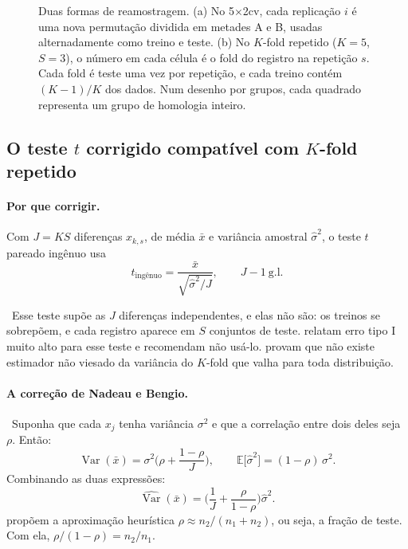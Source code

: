\documentclass[11pt,a4paper]{article}
\newcommand{\etiqueta}[2]{\tcbox[on line, colback=#1!10, colframe=#1!75!black,
  boxrule=0.4pt, arc=1.2pt, left=1.5pt, right=1.5pt, top=0pt, bottom=0pt,
  fontupper=\sffamily\scriptsize\bfseries]{#2}}
\newcommand{\lit}{\etiqueta{oiBlue}{Literatura}}
\DeclareMathOperator{\Var}{Var}
\begin{document}
\begin{figure}[t]
\centering

\caption{Duas formas de reamostragem. (a) No 5$\times$2cv, cada replicação $i$ é uma nova permutação dividida em metades A e B, usadas alternadamente como treino e teste. (b) No $K$-fold repetido ($K=5$, $S=3$), o número em cada célula é o fold do registro na repetição $s$. Cada fold é teste uma vez por repetição, e cada treino contém $(K-1)/K$ dos dados. Num desenho por grupos, cada quadrado representa um grupo de homologia inteiro.}
\label{fig:reamostragem}
\end{figure}

\subsection{O teste \texorpdfstring{$t$}{t} corrigido compatível com \texorpdfstring{$K$}{K}-fold repetido}
\label{sec:tcorrigido}

\paragraph{Por que corrigir.} Com $J=KS$ diferenças $x_{k,s}$, de média $\bar{x}$ e variância amostral $\hat{\sigma}^2$, o teste $t$ pareado ingênuo usa
\begin{equation}
t_{\text{ingênuo}}=\frac{\bar{x}}{\sqrt{\hat{\sigma}^2/J}},\qquad J-1\ \text{g.l.}
\end{equation}

\lit\ Esse teste supõe as $J$ diferenças independentes, e elas não são: os treinos se sobrepõem, e cada registro aparece em $S$ conjuntos de teste. \citet{bouckaert2004} relatam erro tipo I muito alto para esse teste e recomendam não usá-lo. \citet{bengio2004} provam que não existe estimador não viesado da variância do $K$-fold que valha para toda distribuição.

\paragraph{A correção de Nadeau e Bengio.}
\lit\ Suponha que cada $x_j$ tenha variância $\sigma^2$ e que a correlação entre dois deles seja $\rho$. Então:
\begin{equation}
\Var(\bar{x})=\sigma^2\Big(\rho+\frac{1-\rho}{J}\Big),\qquad \mathbb{E}\big[\hat{\sigma}^2\big]=(1-\rho)\,\sigma^2 .
\end{equation}
Combinando as duas expressões:
\begin{equation}
\widehat{\Var}(\bar{x})=\Big(\frac{1}{J}+\frac{\rho}{1-\rho}\Big)\hat{\sigma}^2 .
\end{equation}
\citet{nadeau2003} propõem a aproximação heurística $\rho\approx n_2/(n_1+n_2)$, ou seja, a fração de teste. Com ela, $\rho/(1-\rho)=n_2/n_1$.
\end{document}
